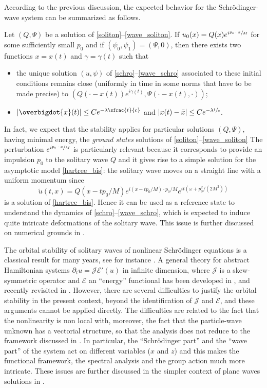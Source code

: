 According to the previous discussion, the expected behavior for the Schrödinger-wave system can be summarized as follows.
\begin{conj}
Let $(Q,\Psi)$ be a solution of \eqref{soliton}--\eqref{wave_soliton}.
If $u_{0}(x)=Q(x)e^{i\sfrac{p_{0}\cdot x}{M}}$ for some sufficiently small $p_{0}$ and if $(\psi_{0},\psi_{1})=(\Psi,0)$, then there exists two functions $x=x(t)$ and $\gamma=\gamma(t)$ such that
\begin{itemize}
\item the unique solution $(u,\psi)$ of \eqref{schro}--\eqref{wave_schro} associated to these initial conditions remains close (uniformly in time in some norms that have to be made precise) to $(Q(\cdot-x(t))e^{i\gamma(t)},\Psi(\cdot-x(t),\cdot))$;
\item $|\overbigdot{x}(t)|\leq C e^{-\lambda\sfrac{t}{c}}$ and $|x(t)-\bar{x}|\leq C e^{-\lambda\sfrac{t}{c}}$.
\end{itemize}
\end{conj}

In fact, we expect that the stability applies for particular solutions $(Q,\Psi)$, having minimal energy, the \emph{ground states} solutions of \eqref{soliton}--\eqref{wave_soliton}
The perturbation $e^{i\sfrac{p_{0}\cdot x}{M}}$ is particularly relevant because
it corresponds to provide an impulsion $p_0$ to the solitary wave
$Q$ and it gives rise
to a simple solution for the asymptotic model \eqref{hartree_bis}:
the solitary wave moves on a straight
line with a uniform momentum
since
\[
\tilde u(t,x)=Q(x-tp_0/M)e^{i(x-tp_0/M)\cdot p_0/M}e^{it(\omega +p_0^2/(2M^2))}
\]
is a solution of \eqref{hartree_bis}.
Hence it can be used as a reference state to understand the dynamics of
\eqref{schro}--\eqref{wave_schro}, which is expected to induce
quite intricate deformations of the solitary wave. This issue is further discussed
on numerical grounds in \cite{LVNum1}.

The orbital stability of solitary waves of nonlinear Schrödinger equations is a classical result for many years, see for instance \cite{Cazenave_Lions_orbital_stab,Weinstein1,Weinstein2}.
A general theory for abstract Hamiltonian systems $\partial_t u=\mathscr J \mathscr E'(u)$
in infinite dimension, where $\mathscr J$ is a skew-symmetric operator and $\mathscr E$ an ``energy'' functional
has been developed in \cite{GSS,GSS2}, and recently revisited in \cite{SRN1}.
However, there are several difficulties to justify the orbital stability in the present context, beyond the identification of $\mathscr J$ and $\mathscr E$, and these arguments cannot be applied directly.
The difficulties are
related to the fact that the nonlinearity is non local with, moreover,
the fact that the particle-wave unknown has a vectorial structure, so that the analysis does not reduce to the framework discussed in \cite{GSS,GSS2}.
In particular,
the ``Schrödinger part'' and the ``wave part'' of the system act on different variables ($x$ and $z$)
and this makes the functional framework, the spectral analysis and the group action much more intricate.
These issues are further discussed in the simpler context of plane waves solutions in \cite{GRN}.

